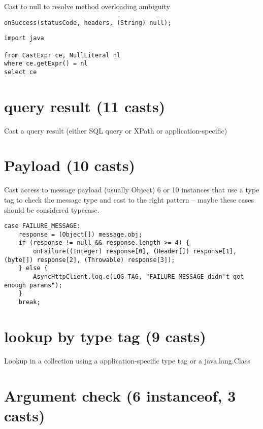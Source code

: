 \documentclass{usiinfdocprop}
\begin{document}
Cast to null to resolve method overloading ambiguity 

\lstset{language=java,label= ,caption= ,captionpos=b,numbers=none}
\begin{lstlisting}
onSuccess(statusCode, headers, (String) null); 
\end{lstlisting}

\lstset{language=ql,label= ,caption= ,captionpos=b,numbers=none}
\begin{lstlisting}
import java

from CastExpr ce, NullLiteral nl
where ce.getExpr() = nl
select ce
\end{lstlisting}

\section{query result (11 casts)}
\label{sec:org0cf6a6b}
Cast a query result (either SQL query or XPath or application-specific) 

\section{Payload (10 casts)}
\label{sec:orgfa0891e}
Cast access to message payload (usually Object) 
6 or 10 instances that use a type tag to check the message type and cast to the right pattern -- maybe these cases should be considered typecase. 

\lstset{language=java,label= ,caption= ,captionpos=b,numbers=none}
\begin{lstlisting}
case FAILURE_MESSAGE: 
    response = (Object[]) message.obj; 
    if (response != null && response.length >= 4) { 
        onFailure((Integer) response[0], (Header[]) response[1], (byte[]) response[2], (Throwable) response[3]); 
    } else { 
        AsyncHttpClient.log.e(LOG_TAG, "FAILURE_MESSAGE didn't got enough params"); 
    } 
    break; 
\end{lstlisting}

\section{lookup by type tag (9 casts)}
\label{sec:orgc2859d6}
Lookup in a collection using a application-specific type tag or a java.lang.Class 

\section{Argument check (6 instanceof, 3 casts)}
\label{sec:org777530a}
\end{document}
